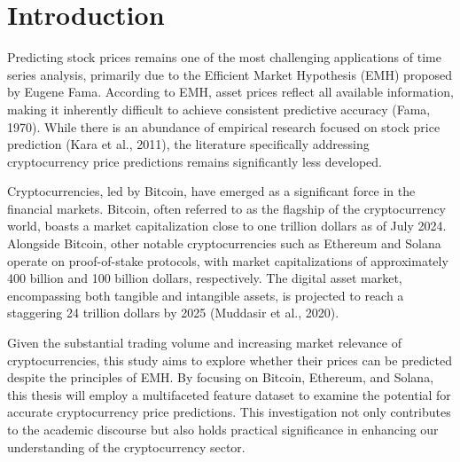 \chapter{Introduction}

Predicting stock prices remains one of the most challenging applications of time series analysis, primarily due to the Efficient Market Hypothesis (EMH) proposed by Eugene Fama. 
According to EMH, asset prices reflect all available information, making it inherently difficult to achieve consistent predictive accuracy (Fama, 1970). 
While there is an abundance of empirical research focused on stock price prediction (Kara et al., 2011), the literature specifically addressing cryptocurrency price predictions 
remains significantly less developed.


Cryptocurrencies, led by Bitcoin, have emerged as a significant force in the financial markets. 
Bitcoin, often referred to as the flagship of the cryptocurrency world, boasts a market capitalization close to one trillion dollars as of July 2024. 
Alongside Bitcoin, other notable cryptocurrencies such as Ethereum and Solana operate on proof-of-stake protocols, with market capitalizations of approximately 
400 billion and 100 billion dollars, respectively. The digital asset market, encompassing both tangible and intangible assets, is projected to reach a staggering
 24 trillion dollars by 2025 (Muddasir et al., 2020).

 
Given the substantial trading volume and increasing market relevance of cryptocurrencies, this study aims to explore whether their prices can be predicted despite the principles of EMH. 
By focusing on Bitcoin, Ethereum, and Solana, this thesis will employ a multifaceted feature dataset to examine the potential for accurate cryptocurrency price predictions. 
This investigation not only contributes to the academic discourse but also holds practical significance in enhancing our understanding of the cryptocurrency sector.
